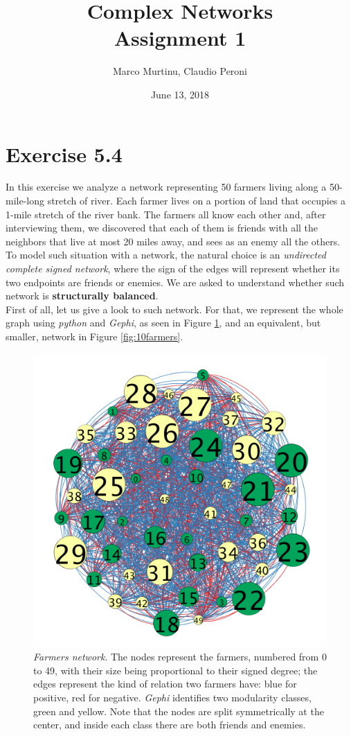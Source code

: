 \documentclass{report}
\title{Complex Networks\\ \large Assignment 1}
\author{{Marco Murtinu, Claudio Peroni}}
\date{June 13, 2018}
\theoremstyle{definition}
\theoremstyle{remark}
\begin{document}
	\maketitle

\section*{Exercise 5.4}

In this exercise we analyze a network representing 50 farmers living along a 50-mile-long stretch of river. Each farmer lives on a portion of land that occupies a 1-mile stretch of the river bank. The farmers all know each other and, after interviewing them, we discovered that each of them is friends with all the neighbors that live at most 20 miles away, and sees as an enemy all the others.\\
To model such situation with a network, the natural choice is an \textit{undirected complete signed network}, where the sign of the edges will represent whether its two endpoints are friends or enemies. We are asked to understand whether such network is \textbf{structurally balanced}.\\
First of all, let us give a look to such network. For that, we represent the whole graph using \textit{python} and \textit{Gephi}, as seen in Figure \ref{fig:50farmers}, and an equivalent, but smaller, network in Figure \ref{fig:10farmers}.\\
\begin{figure} [h]
	\centering
	\includegraphics [scale = 0.28]{farmers_complete.png}
	\caption{\textit{Farmers network}. The nodes represent the farmers, numbered from 0 to 49, with their size being proportional to their signed degree; the edges represent the kind of relation two farmers have: blue for positive, red for negative. \textit{Gephi} identifies two modularity classes, green and yellow. Note that the nodes are split symmetrically at the center, and inside each class there are both friends and enemies.} 	\label{fig:50farmers}
\end{figure}
\end{document}
